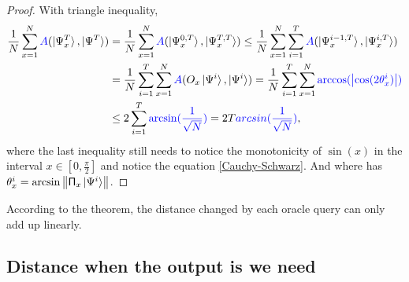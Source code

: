 \documentclass[a4paper,10pt]{article}
\numberwithin{equation}{subsection}
\begin{document}
\begin{proof}
    With triangle inequality,
    \begin{equation*}
        \begin{split}
            \frac{1}{N}\sum_{x=1}^{N}\textcolor{blue}{A}(\ket{\Psi_{x}^{T}},\ket{\Psi^{T}})
             & = \frac{1}{N}\sum_{x=1}^{N}\textcolor{blue}{A}(\ket{\Psi_{x}^{0,T}},\ket{\Psi_{x}^{T,T}})
            \leq \frac{1}{N}\sum_{x=1}^{N}\sum_{i=1}^{T}\textcolor{blue}{A}(\ket{\Psi_{x}^{i-1,T}},\ket{\Psi_{x}^{i,T}})           \\
             & = \frac{1}{N}\sum_{i=1}^{T}\sum_{x=1}^{N}\textcolor{blue}{A}(O_{x}\ket{\Psi^{i}},\ket{\Psi^{i}})
            = \frac{1}{N}\sum_{i=1}^{T}\sum_{x=1}^{N}\textcolor{blue}{\arccos(\left\lvert\cos(2\theta_{x}^{i})\right\rvert)}       \\
             & \leq 2\sum_{i=1}^{T}\textcolor{blue}{\arcsin(\frac{1}{\sqrt{N}})} = 2T\textcolor{blue}{arcsin(\frac{1}{\sqrt{N}})},
        \end{split}
    \end{equation*}
    where the last inequality still needs to notice the monotonicity of $\sin(x)$ in the interval $x\in\left[0,\frac{\pi}{2}\right]$ and notice the equation \ref{Cauchy-Schwarz}. And where has $\theta_{x}^{i}=\arcsin\left\| \mathsf{\Pi}_{x}\ket{\Psi^{i}}\right\|$.
\end{proof}
According to the theorem, the distance changed by each oracle query can only add up linearly.



\subsection{Distance when the output is we need}
\end{document}
